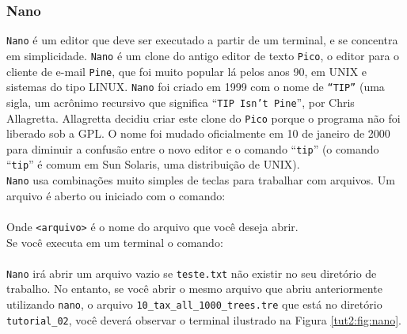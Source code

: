 \begin{refsection}

\subsubsection{Nano}\label{tut2:text:editors:nano}

\texttt{Nano} é um editor que deve ser executado a partir de um terminal, e se concentra em simplicidade. \texttt{Nano} é um clone do antigo editor de texto \texttt{Pico}, o editor para o cliente de e-mail \texttt{Pine}, que foi muito popular lá pelos anos 90, em UNIX e sistemas do tipo LINUX. \texttt{Nano} foi criado em 1999 com o nome de \texttt{``TIP''} (uma sigla, um acrônimo recursivo que significa ``\texttt{TIP Isn't Pine}'', por Chris Allagretta. Allagretta decidiu criar este clone do \texttt{Pico} porque o programa não foi liberado sob a GPL. O nome foi mudado oficialmente em 10 de janeiro de 2000 para diminuir a confusão entre o novo editor e o comando ``\texttt{tip}'' (o comando ``\texttt{tip}'' é comum em Sun Solaris, uma distribuição de UNIX).\\
\texttt{Nano} usa combinações muito simples de teclas para trabalhar com arquivos. Um arquivo é aberto ou iniciado com o comando: \\

\\

Onde \texttt{<arquivo>} é o nome do arquivo que você deseja abrir.\\
Se você executa em um terminal o comando:\\

\\


\texttt{Nano} irá abrir um arquivo vazio se \texttt{teste.txt} não existir no seu diretório de trabalho. No entanto, se você abrir o mesmo arquivo que abriu anteriormente utilizando \texttt{nano}, o arquivo \texttt{10\_tax\_all\_1000\_trees.tre} que está no diretório \texttt{tutorial\_02}, você deverá observar o terminal ilustrado na Figura \ref{tut2:fig:nano}.\\


\end{refsection}

